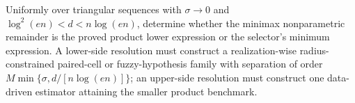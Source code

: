 Uniformly over triangular sequences with \(\sigma\to0\) and \(\log^2(en)<d<n\log(en)\), determine whether the minimax nonparametric remainder is the proved product lower expression or the selector's minimum expression.  A lower-side resolution must construct a realization-wise radius-constrained paired-cell or fuzzy-hypothesis family with separation of order \(M\min\{\sigma,d/[n\log(en)]\}\); an upper-side resolution must construct one data-driven estimator attaining the smaller product benchmark.